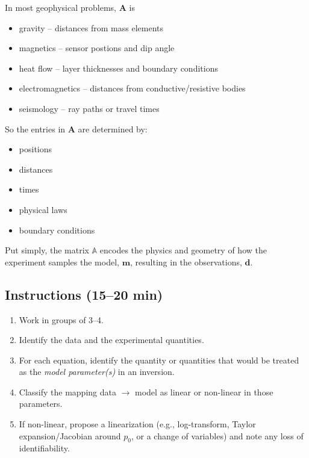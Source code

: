 \documentclass[11pt,a4paper]{article}
\begin{document}
In most geophysical problems, \(\mathbf{A}\) is
\begin{itemize}
  \item gravity -- distances from mass elements
  \item magnetics -- sensor postions and dip angle
  \item heat flow -- layer thicknesses and boundary conditions
  \item electromagnetics -- distances from conductive/resistive bodies
  \item seismology -- ray paths or travel times
\end{itemize}
So the entries in \(\mathbf{A}\) are determined by:
\begin{itemize}
  \item positions
  \item distances
  \item times
  \item physical laws
  \item boundary conditions
\end{itemize}

Put simply, the matrix \(\mathbb{A}\) encodes the physics and geometry of how the experiment samples the model, \(\mathbf{m}\), resulting in the observations, \(\mathbf{d}\).

\subsection*{Instructions (15--20 min)}
\begin{enumerate}[label=\arabic*.,itemsep=2pt]
  \item Work in groups of 3--4.
  \item Identify the data and the experimental quantities.
  \item For each equation, identify the quantity or quantities that would be treated as the \emph{model parameter(s)} in an inversion.
  \item Classify the mapping data $\to$ model as linear or non-linear in those parameters.
  \item If non-linear, propose a linearization (e.g., log-transform, Taylor expansion/Jacobian around $p_0$, or a change of variables) and note any loss of identifiability.
\end{enumerate}
\end{document}

